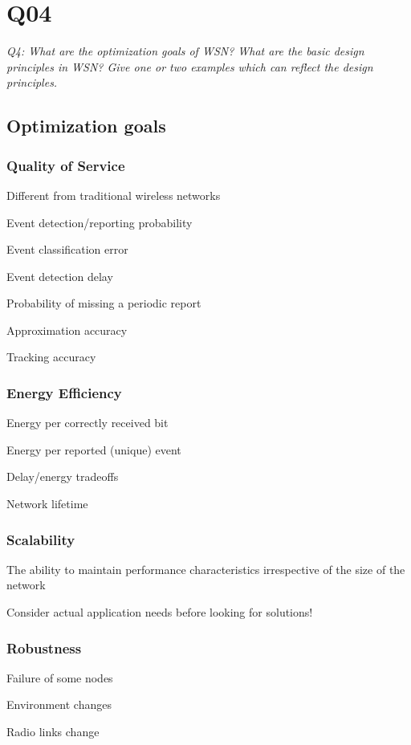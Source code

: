 \chapter{Q04}
\emph{Q4: What are the optimization goals of WSN? What are the basic design
principles in WSN? Give one or two examples which can reflect the design
principles.}

\section{Optimization goals}

\subsection{Quality of Service}
Different from traditional wireless networks

\begin{description}
	\item Event detection/reporting probability
	\item Event classification error
	\item Event detection delay
	\item Probability of missing a periodic report
	\item Approximation accuracy
	\item Tracking accuracy
\end{description}


\subsection{Energy Efficiency}
\begin{description}
	\item Energy per correctly received bit
	\item Energy per reported (unique) event
	\item Delay/energy tradeoffs
	\item Network lifetime
\end{description}

\subsection{Scalability}
The ability to maintain performance characteristics irrespective of the size of
the network

Consider actual application needs before looking for solutions!

\subsection{Robustness}
\begin{description}
	\item Failure of some nodes
	\item Environment changes
	\item Radio links change
\end{description}


